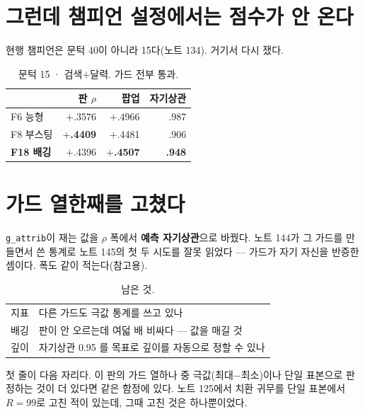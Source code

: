 \documentclass[10pt]{article}
\begin{document}

\section{그런데 챔피언 설정에서는 점수가 안 온다}

현행 챔피언은 문턱 40이 아니라 15다(노트 134). 거기서 다시 쟀다.

\begin{table}[t]
\centering\tsize
\caption{문턱 15 · 검색$+$달력. 가드 전부 통과.}
\begin{tabular}{lrrr}
\toprule
& 판 $\rho$ & 팝업 & 자기상관 \\
\midrule
F6 능형 & $+$.3576 & $+$.4966 & .987 \\
F8 부스팅 & \textbf{$+$.4409} & $+$.4481 & .906 \\
\textbf{F18 배깅} & $+$.4396 & \textbf{$+$.4507} & \textbf{.948} \\
\bottomrule
\end{tabular}
\end{table}



\section{가드 열한째를 고쳤다}

\texttt{g\_attrib}이 재는 값을 $\rho$ 폭에서 \textbf{예측 자기상관}으로
바꿨다. 노트 144가 그 가드를 만들면서 쓴 통계로 노트 145의 첫 두 시도를
잘못 읽었다 --- 가드가 자기 자신을 반증한 셈이다. 폭도 같이 적는다(참고용).

\begin{table}[t]
\centering\tsize
\caption{남은 것.}
\begin{tabular}{ll}
\toprule
지표 & 다른 가드도 극값 통계를 쓰고 있나 \\
배깅 & 판이 안 오르는데 여덟 배 비싸다 --- 값을 매길 것 \\
깊이 & 자기상관 0.95 를 목표로 깊이를 자동으로 정할 수 있나 \\
\bottomrule
\end{tabular}
\end{table}

첫 줄이 다음 자리다. 이 판의 가드 열하나 중 극값(최대$-$최소)이나 단일
표본으로 판정하는 것이 더 있다면 같은 함정에 있다. 노트 125에서 치환 귀무를
단일 표본에서 $R=99$로 고친 적이 있는데, 그때 고친 것은 하나뿐이었다.
\end{document}
